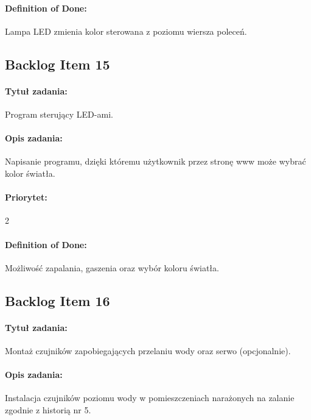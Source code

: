 	\paragraph{Definition of Done:}
	Lampa LED zmienia kolor sterowana z poziomu wiersza poleceń.



	\subsection{Backlog Item 15}
	\paragraph{Tytuł zadania:}
	Program sterujący LED-ami.
	
	\paragraph{Opis zadania:}
	Napisanie programu, dzięki któremu użytkownik przez stronę www może wybrać kolor światła.
	
	\paragraph{Priorytet:}
	2
	
	\paragraph{Definition of Done:}
	Możliwość zapalania, gaszenia oraz wybór koloru światła.


	
	\subsection{Backlog Item 16}
	\paragraph{Tytuł zadania:}
	Montaż czujników zapobiegających przelaniu wody oraz serwo (opcjonalnie).
	
	\paragraph{Opis zadania:} 
	Instalacja czujników poziomu wody w pomieszczeniach narażonych na zalanie zgodnie z historią nr 5.
	
